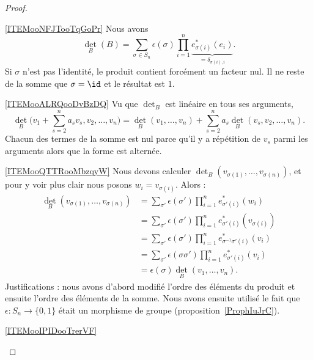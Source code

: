 \begin{proof}
\begin{subproof}
        \item[\ref{ITEMooNFJTooTqGoPr}]
            Nous avons
            \begin{equation}
                \det_B(B)=\sum_{\sigma\in S_n}\epsilon(\sigma)\prod_{i=1}^n\underbrace{e_{\sigma(i)}^*(e_i)}_{=\delta_{\sigma(i),i}}.
            \end{equation}
            Si \( \sigma\) n'est pas l'identité, le produit contient forcément un facteur nul. Il ne reste de la somme que \( \sigma=\id\) et le résultat est \( 1\).
        \item[\ref{ITEMooALRQooDvBzDQ}]
            Vu que \( \det_B\) est linéaire en tous ses arguments,
            \begin{equation}
                \det_B\big( v_1+\sum_{s=2}^na_sv_s,v_2,\ldots, v_n \big)=\det_B(v_1,\ldots, v_n)+\sum_{s=2}^na_s\det_B(v_s,v_2,\ldots, v_n).
            \end{equation}
            Chacun des termes de la somme est nul parce qu'il y a répétition de \( v_s\) parmi les arguments alors que la forme est alternée.
        \item[\ref{ITEMooQTTRooMbzqyW}]
            Nous devons calculer \( \det_B(v_{\sigma(1)},\ldots, v_{\sigma(n)})\), et pour y voir plus clair nous posons \( w_i=v_{\sigma(i)}\). Alors :
            \begin{subequations}
                \begin{align}
                    \det_B(v_{\sigma(1)},\ldots, v_{\sigma(n)})&=\sum_{\sigma'}\epsilon(\sigma')\prod_{i=1}^ne^*_{\sigma'(i)}(w_i)\\
                    &=\sum_{\sigma'}\epsilon(\sigma')\prod_{i=1}^ne^*_{\sigma'(i)}(v_{\sigma(i)})\\
                    &=\sum_{\sigma'}\epsilon(\sigma')\prod_{i=1}^ne^*_{\sigma^{-1}\sigma'(i)}(v_i)\\
                    &=\sum_{\sigma'}\epsilon(\sigma\sigma')\prod_{i=1}^ne^*_{\sigma'(i)}(v_i)\\
                    &=\epsilon(\sigma)\det_B(v_1,\ldots, v_n).
                \end{align}
            \end{subequations}
            Justifications : nous avons d'abord modifié l'ordre des éléments du produit et ensuite l'ordre des éléments de la somme. Nous avons ensuite utilisé le fait que \( \epsilon\colon S_n\to \{ 0,1 \}\) était un morphisme de groupe (proposition~\ref{ProphIuJrC}).
        \item[\ref{ITEMooIPIDooTrerVF}]

\end{subproof}
\end{proof}
